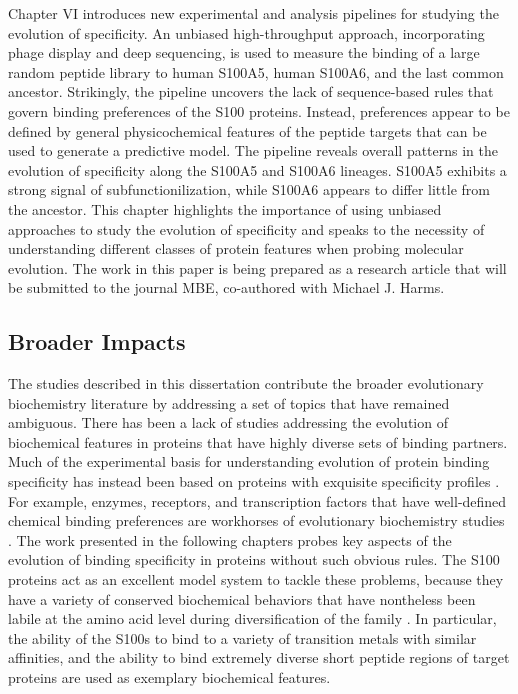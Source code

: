 Chapter VI introduces new experimental and analysis pipelines for
studying the evolution of specificity. An unbiased high-throughput
approach, incorporating phage display and deep sequencing, is used
to measure the binding of a large random peptide library to human
S100A5, human S100A6, and the last common ancestor. Strikingly, the
pipeline uncovers the lack of sequence-based rules that govern binding
preferences of the S100 proteins. Instead, preferences appear to be
defined by general physicochemical features of the peptide targets
that can be used to generate a predictive model. The pipeline reveals
overall patterns in the evolution of specificity along the S100A5
and S100A6 lineages. S100A5 exhibits a strong signal of subfunctionilization,
while S100A6 appears to differ little from the ancestor. This chapter
highlights the importance of using unbiased approaches to study the
evolution of specificity and speaks to the necessity of understanding
different classes of protein features when probing molecular evolution.
The work in this paper is being prepared as a research article that
will be submitted to the journal MBE, co-authored with Michael J.
Harms. 

\subsection{Broader Impacts}

The studies described in this dissertation contribute the broader
evolutionary biochemistry literature by addressing a set of topics
that have remained ambiguous. There has been a lack of studies addressing
the evolution of biochemical features in proteins that have highly
diverse sets of binding partners. Much of the experimental basis for
understanding evolution of protein binding specificity has instead
been based on proteins with exquisite specificity profiles \citep{zarrinpar_optimization_2003,stiffler_pdz_2007}.
For example, enzymes, receptors, and transcription factors that have
well-defined chemical binding preferences are workhorses of evolutionary
biochemistry studies \citep{harms_historical_2014,boucher_atomic-resolution_2014,mckeown_evolution_2014,eick_evolution_2012}.
The work presented in the following chapters probes key aspects of
the evolution of binding specificity in proteins without such obvious
rules. The S100 proteins act as an excellent model system to tackle
these problems, because they have a variety of conserved biochemical
behaviors that have nontheless been labile at the amino acid level
during diversification of the family \citep{wheeler_multiple_2016}.
In particular, the ability of the S100s to bind to a variety of transition
metals with similar affinities, and the ability to bind extremely
diverse short peptide regions of target proteins are used as exemplary
biochemical features. 

